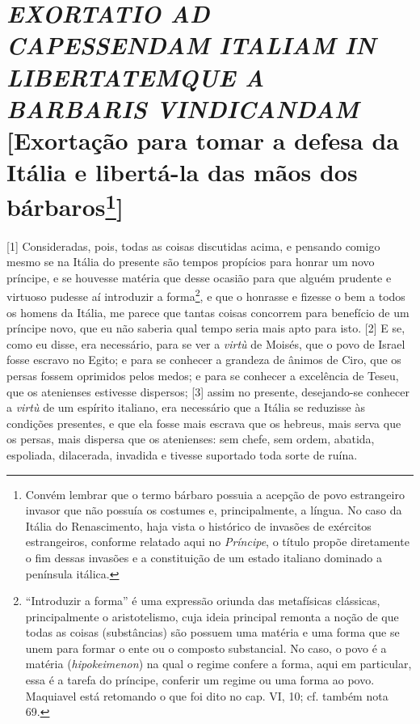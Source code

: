 \quebra\section{\emph{EXORTATIO AD CAPESSENDAM ITALIAM IN LIBERTATEMQUE A BARBARIS VINDICANDAM}
{[}Exortação para tomar a defesa da Itália e libertá-la das mãos dos
bárbaros\protect\footnote{Convém lembrar que o termo bárbaro possuia a acepção
  de povo estrangeiro invasor que não possuía os costumes e,
  principalmente, a língua. No caso da Itália do Renascimento, haja
  vista o histórico de invasões de exércitos estrangeiros, conforme
  relatado aqui no \emph{Príncipe}, o título propõe diretamente o fim
  dessas invasões e a constituição de um estado italiano dominado a
  península itálica.}{]}}

{[}1{]} Consideradas, pois, todas as coisas discutidas acima, e pensando
comigo mesmo se na Itália do presente são tempos propícios para honrar
um novo príncipe, e se houvesse matéria que desse ocasião para que
alguém prudente e virtuoso pudesse aí introduzir a forma\footnote{``Introduzir
  a forma'' é uma expressão oriunda das metafísicas clássicas,
  principalmente o aristotelismo, cuja ideia principal remonta a noção
  de que todas as coisas (substâncias) são possuem uma matéria e uma
  forma que se unem para formar o ente ou o composto substancial. No
  caso, o povo é a matéria (\emph{hipokeimenon}) na qual o regime
  confere a forma, aqui em particular, essa é a tarefa do príncipe,
  conferir um regime ou uma forma ao povo. Maquiavel está retomando o
  que foi dito no cap. VI, 10; cf. também nota 69.}, e que o honrasse e
fizesse o bem a todos os homens da Itália, me parece que tantas coisas
concorrem para benefício de um príncipe novo, que eu não saberia qual
tempo seria mais apto para isto. {[}2{]} E se, como eu disse, era
necessário, para se ver a \emph{virtù} de Moisés, que o povo de Israel
fosse escravo no Egito; e para se conhecer a grandeza de ânimos de Ciro,
que os persas fossem oprimidos pelos medos; e para se conhecer a
excelência de Teseu, que os atenienses estivesse dispersos; {[}3{]}
assim no presente, desejando-se conhecer a \emph{virtù} de um espírito
italiano, era necessário que a Itália se reduzisse às condições
presentes, e que ela fosse mais escrava que os hebreus, mais serva que
os persas, mais dispersa que os atenienses: sem chefe, sem ordem,
abatida, espoliada, dilacerada, invadida e tivesse suportado toda sorte
de ruína.

